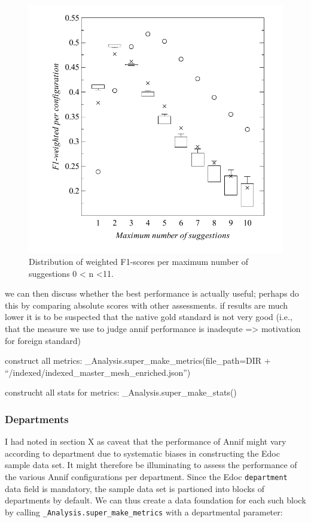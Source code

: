 \begin{figure}
\centering
\includegraphics{images/metrics_all_n.pdf}
\caption{Distribution of weighted F1-scores per maximum number of
suggestions 0 \textless{} n \textless11.}
\end{figure}

we can then discuss whether the best performance is actually useful;
perhaps do this by comparing absolute scores with other assessments. if
results are much lower it is to be suspected that the native gold
standard is not very good (i.e., that the measure we use to judge annif
performance is inadequte =\textgreater{} motivation for foreign
standard)

construct all metrics: \_Analysis.super\_make\_metrics(file\_path=DIR +
``/indexed/indexed\_master\_mesh\_enriched.json'')

construcht all stats for metrics: \_Analysis.super\_make\_stats()

\hypertarget{departments}{%
\subsubsection{Departments}\label{departments}}

I had noted in section X as caveat that the performance of Annif might
vary according to department due to systematic biases in constructing
the Edoc sample data set. It might therefore be illuminating to assess
the performance of the various Annif configurations per department.
Since the Edoc \texttt{department} data field is mandatory, the sample
data set is partioned into blocks of departments by default. We can thus
create a data foundation for each such block by calling
\texttt{\_Analysis.super\_make\_metrics} with a departmental parameter:

